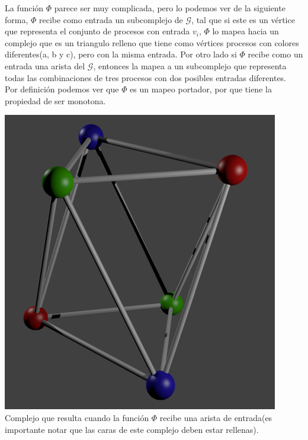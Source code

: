 \documentclass{article}
\begin{document}
\begin{enumerate}
{\begin{itemize}
      \end{itemize}

      La función $\Phi$ parece ser muy complicada, pero lo podemos ver
      de la siguiente forma, $\Phi$ recibe como entrada un
      subcomplejo de $\mathcal{G}$, tal que si este es un vértice que
      representa el conjunto de procesos con entrada $v_i$, $\Phi$ lo
      mapea hacia un complejo que es un triangulo relleno que tiene
      como vértices procesos con colores diferentes(a, b y c), pero con la misma
      entrada. Por otro lado si $\Phi$ recibe como un entrada una
      arista del $\mathcal{G}$, entonces la mapea a un subcomplejo que
      representa todas las combinaciones de tres procesos con dos
      posibles entradas diferentes.\\ Por definición podemos ver que
      $\Phi$ es un mapeo portador, por que tiene la propiedad de ser monotona.
      
      
      \begin{center}
        \includegraphics[scale=0.4]{phi_map.png}
        \\Complejo que resulta cuando la función $\Phi$ recibe una
        arista de entrada(es importante notar que las caras de este
        complejo deben estar rellenas).\\
      \end{center}
    
}
\end{enumerate}
\end{document}
